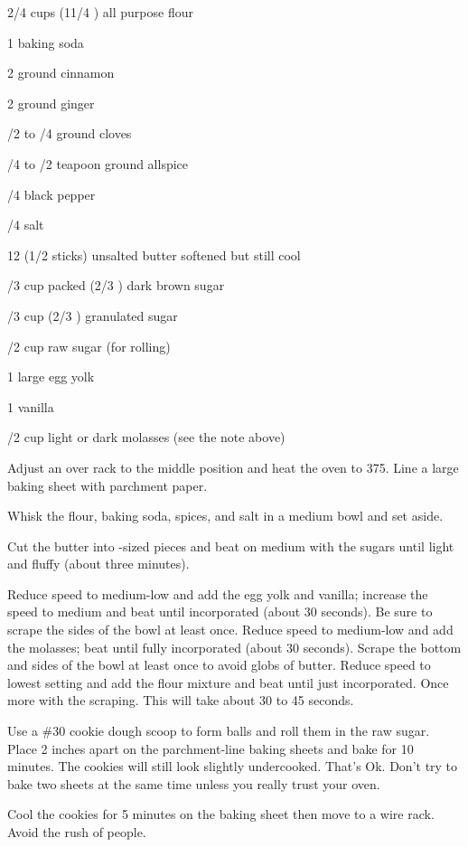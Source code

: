 \begin{IngredientsAndSteps}
    \ListIngredientsAndSteps
    {
        2/4 cups (11/4 \Ounce[s]) all purpose flour

        1 \tsp baking soda

        2 \tsp[s] ground cinnamon

        2 \tsp[s] ground ginger

        /2 to /4 \tsp ground cloves

        /4 to /2 teapoon ground allspice

        /4 \tsp black pepper

        /4 \tsp salt

        \IngredientsSeparatorClear

        12 \Tbl[s] (1/2 sticks) unsalted butter softened but still cool

        /3 cup packed (2/3 \Ounce[s]) dark brown sugar

        /3 cup (2/3 \Ounce[s]) granulated sugar

        /2 cup raw sugar (for rolling)

        1 large egg yolk

        1 \tsp vanilla

        /2 cup light or dark molasses (see the note above)

    }
    {
        Adjust an over rack to the middle position and heat the oven to 375\Degrees[F]. Line a large baking sheet
        with parchment paper.

        Whisk the flour, baking soda, spices, and salt in a medium bowl and set aside.

        Cut the butter into \Tbl-sized pieces and beat on medium with the sugars until light and fluffy
        (about three minutes).

        Reduce speed to medium-low and add the egg yolk and vanilla; increase the speed to medium and beat
        until incorporated (about 30 seconds). Be sure to scrape the sides of the bowl at least once. Reduce
        speed to medium-low and add the molasses; beat until fully incorporated (about 30 seconds). Scrape the
        bottom and sides of the bowl at least once to avoid globs of butter. Reduce speed to lowest setting
        and add the flour mixture and beat until just incorporated. Once more with the scraping. This will
        take about 30 to 45 seconds.

        Use a \#30 cookie dough scoop to form balls and roll them in the raw sugar.
        Place 2 inches apart on the parchment-line baking sheets and bake for 10 minutes. The cookies will
        still look slightly undercooked. That's Ok. Don't try to bake two sheets at the same time unless
        you really trust your oven.

        Cool the cookies for 5 minutes on the baking sheet then move to a wire rack. Avoid the rush of people.
    }
\end{IngredientsAndSteps}

